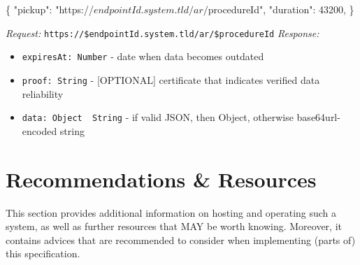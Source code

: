 \documentclass[12pt,english,a4paper,titlepage,cleardoublepage=empty,dottedtoc]{report}
\newenvironment{Shaded}{\begin{snugshade}}{\end{snugshade}}
\newcommand{\DataTypeTok}[1]{\textcolor[rgb]{0.13,0.29,0.53}{#1}}
\newcommand{\DecValTok}[1]{\textcolor[rgb]{0.00,0.00,0.81}{#1}}
\newcommand{\StringTok}[1]{\textcolor[rgb]{0.31,0.60,0.02}{#1}}
\newcommand{\FunctionTok}[1]{\textcolor[rgb]{0.00,0.00,0.00}{#1}}
\newcommand{\ErrorTok}[1]{\textcolor[rgb]{0.64,0.00,0.00}{\textbf{#1}}}
\providecommand{\tightlist}{%
  \setlength{\itemsep}{0pt}\setlength{\parskip}{0pt}}
\begin{document}
\begin{Shaded}
\begin{Highlighting}[numbers=left,,]
\FunctionTok{\{}
    \DataTypeTok{"pickup"}\FunctionTok{:} \StringTok{"https://$endpointId.system.tld/ar/$procedureId"}\FunctionTok{,}
    \DataTypeTok{"duration"}\FunctionTok{:} \DecValTok{43200}\FunctionTok{,}
\FunctionTok{\}}
\end{Highlighting}
\end{Shaded}

\emph{Request:}
\texttt{https://\$endpointId.system.tld/ar/\$procedureId}
\emph{Response:}

\begin{itemize}
\tightlist
\item
  \texttt{expiresAt:\ Number} - date when data becomes outdated
\item
  \texttt{proof:\ String} - {[}OPTIONAL{]} certificate that indicates
  verified data reliability
\item
  \texttt{data:\ Object\ \textbar{}\textbar{}\ String} - if valid JSON,
  then Object, otherwise base64url-encoded string
\end{itemize}

\begin{Shaded}
\end{Shaded}

\section{Recommendations \& Resources}\label{recommendations-resources}

This section provides additional information on hosting and operating
such a system, as well as further resources that MAY be worth knowing.
Moreover, it contains advices that are recommended to consider when
implementing (parts of) this specification.
\end{document}
